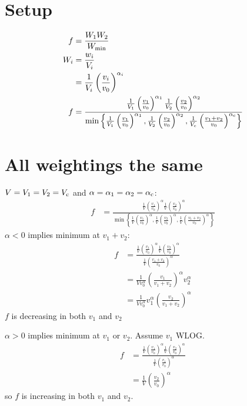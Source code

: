 \documentclass{article}
\begin{document}
\section{Setup}

\begin{align}
  f &= \frac{W_1 W_2}{W_{\rm min}} \\
  W_i &= \frac{w_i}{V_i} \\
  &= \frac{1}{V_i} \left(\frac{v_i}{v_0}\right)^{\alpha_i} \\
  f &= \frac{\frac{1}{V_1} \left(\frac{v_1}{v_0}\right)^{\alpha_1}
    \frac{1}{V_2} \left(\frac{v_2}{v_0}\right)^{\alpha_2}}{
    \min\left\{ \frac{1}{V_1} \left(\frac{v_1}{v_0}\right)^{\alpha_1},
        \frac{1}{V_2} \left(\frac{v_2}{v_0}\right)^{\alpha_2},
        \frac{1}{V_{\rm c}} \left(\frac{v_1 + v_2}{v_0}\right)^{\alpha_{\rm c}} \right\}}
\end{align}

\section{All weightings the same}

$V = V_1 = V_2 = V_{\rm c}$ and $\alpha = \alpha_1 = \alpha_2 = \alpha_{\rm c}$:
\begin{align}
  f &= \frac{\frac{1}{V} \left(\frac{v_1}{v_0}\right)^{\alpha}
    \frac{1}{V} \left(\frac{v_2}{v_0}\right)^{\alpha}}{
    \min\left\{ \frac{1}{V} \left(\frac{v_1}{v_0}\right)^{\alpha},
        \frac{1}{V} \left(\frac{v_2}{v_0}\right)^{\alpha},
        \frac{1}{V} \left(\frac{v_1 + v_2}{v_0}\right)^{\alpha} \right\}}
\end{align}
$\alpha < 0$ implies minimum at $v_1 + v_2$:
\begin{align}
  f &= \frac{\frac{1}{V} \left(\frac{v_1}{v_0}\right)^{\alpha}
    \frac{1}{V} \left(\frac{v_2}{v_0}\right)^{\alpha}}{
    \frac{1}{V} \left(\frac{v_1 + v_2}{v_0}\right)^{\alpha}} \\
  &= \frac{1}{V v_0^\alpha} \left(\frac{v_1}{v_1 + v_2}\right)^\alpha v_2^\alpha \\
  &= \frac{1}{V v_0^\alpha} v_1^\alpha \left(\frac{v_2}{v_1 + v_2}\right)^\alpha
\end{align}
$f$ is decreasing in both $v_1$ and $v_2$

$\alpha > 0$ implies minimum at $v_1$ or $v_2$. Assume $v_1$ WLOG.
\begin{align}
  f &= \frac{\frac{1}{V} \left(\frac{v_1}{v_0}\right)^{\alpha}
    \frac{1}{V} \left(\frac{v_2}{v_0}\right)^{\alpha}}{
    \frac{1}{V} \left(\frac{v_1}{v_0}\right)^{\alpha}} \\
  &= \frac{1}{V} \left(\frac{v_2}{v_0}\right)^{\alpha}
\end{align}
so $f$ is increasing in both $v_1$ and $v_2$.
\end{document}

